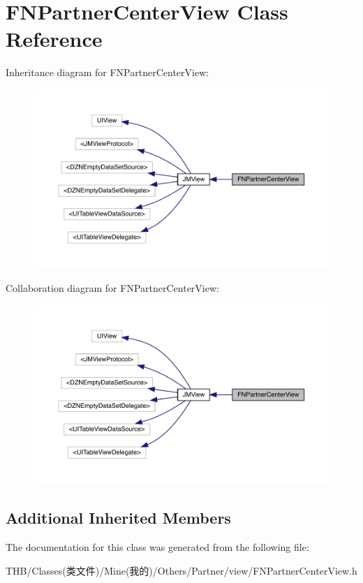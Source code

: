 \hypertarget{interface_f_n_partner_center_view}{}\section{F\+N\+Partner\+Center\+View Class Reference}
\label{interface_f_n_partner_center_view}


Inheritance diagram for F\+N\+Partner\+Center\+View\+:\nopagebreak
\begin{figure}[H]
\begin{center}
\leavevmode
\includegraphics[width=350pt]{interface_f_n_partner_center_view__inherit__graph}
\end{center}
\end{figure}


Collaboration diagram for F\+N\+Partner\+Center\+View\+:\nopagebreak
\begin{figure}[H]
\begin{center}
\leavevmode
\includegraphics[width=350pt]{interface_f_n_partner_center_view__coll__graph}
\end{center}
\end{figure}
\subsection*{Additional Inherited Members}


The documentation for this class was generated from the following file\+:\begin{DoxyCompactItemize}
\item 
T\+H\+B/\+Classes(类文件)/\+Mine(我的)/\+Others/\+Partner/view/F\+N\+Partner\+Center\+View.\+h\end{DoxyCompactItemize}
